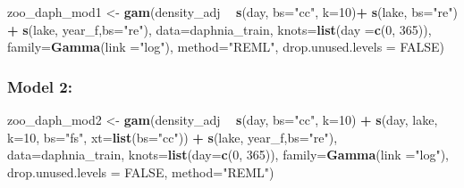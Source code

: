 \documentclass[12pt]{article}
\newenvironment{Shaded}{\begin{snugshade}}{\end{snugshade}}
\newcommand{\KeywordTok}[1]{\textcolor[rgb]{0.13,0.29,0.53}{\textbf{#1}}}
\newcommand{\DataTypeTok}[1]{\textcolor[rgb]{0.13,0.29,0.53}{#1}}
\newcommand{\DecValTok}[1]{\textcolor[rgb]{0.00,0.00,0.81}{#1}}
\newcommand{\StringTok}[1]{\textcolor[rgb]{0.31,0.60,0.02}{#1}}
\newcommand{\OtherTok}[1]{\textcolor[rgb]{0.56,0.35,0.01}{#1}}
\newcommand{\OperatorTok}[1]{\textcolor[rgb]{0.81,0.36,0.00}{\textbf{#1}}}
\newcommand{\NormalTok}[1]{#1}
\begin{document}
\begin{Shaded}
\begin{Highlighting}[]
\NormalTok{zoo_daph_mod1 <-}\StringTok{ }\KeywordTok{gam}\NormalTok{(density_adj }\OperatorTok{~}\StringTok{ }\KeywordTok{s}\NormalTok{(day, }\DataTypeTok{bs=}\StringTok{"cc"}\NormalTok{, }\DataTypeTok{k=}\DecValTok{10}\NormalTok{)}\OperatorTok{+}
\StringTok{                       }\KeywordTok{s}\NormalTok{(lake, }\DataTypeTok{bs=}\StringTok{"re"}\NormalTok{) }\OperatorTok{+}\StringTok{ }
\StringTok{                       }\KeywordTok{s}\NormalTok{(lake, year_f,}\DataTypeTok{bs=}\StringTok{"re"}\NormalTok{),}
                     \DataTypeTok{data=}\NormalTok{daphnia_train,}
                     \DataTypeTok{knots=}\KeywordTok{list}\NormalTok{(}\DataTypeTok{day =}\KeywordTok{c}\NormalTok{(}\DecValTok{0}\NormalTok{, }\DecValTok{365}\NormalTok{)),}
                     \DataTypeTok{family=}\KeywordTok{Gamma}\NormalTok{(}\DataTypeTok{link =}\StringTok{"log"}\NormalTok{),}
                     \DataTypeTok{method=}\StringTok{"REML"}\NormalTok{,}
                     \DataTypeTok{drop.unused.levels =} \OtherTok{FALSE}\NormalTok{)}
\end{Highlighting}
\end{Shaded}

\subsubsection{Model 2:}\label{model-2}

\begin{Shaded}
\begin{Highlighting}[]
\NormalTok{zoo_daph_mod2 <-}
\StringTok{  }\KeywordTok{gam}\NormalTok{(density_adj }\OperatorTok{~}\StringTok{ }\KeywordTok{s}\NormalTok{(day, }\DataTypeTok{bs=}\StringTok{"cc"}\NormalTok{, }\DataTypeTok{k=}\DecValTok{10}\NormalTok{) }\OperatorTok{+}\StringTok{ }
\StringTok{        }\KeywordTok{s}\NormalTok{(day, lake, }\DataTypeTok{k=}\DecValTok{10}\NormalTok{, }\DataTypeTok{bs=}\StringTok{"fs"}\NormalTok{, }\DataTypeTok{xt=}\KeywordTok{list}\NormalTok{(}\DataTypeTok{bs=}\StringTok{"cc"}\NormalTok{)) }\OperatorTok{+}\StringTok{ }
\StringTok{        }\KeywordTok{s}\NormalTok{(lake, year_f,}\DataTypeTok{bs=}\StringTok{"re"}\NormalTok{),}
      \DataTypeTok{data=}\NormalTok{daphnia_train, }
      \DataTypeTok{knots=}\KeywordTok{list}\NormalTok{(}\DataTypeTok{day=}\KeywordTok{c}\NormalTok{(}\DecValTok{0}\NormalTok{, }\DecValTok{365}\NormalTok{)), }
      \DataTypeTok{family=}\KeywordTok{Gamma}\NormalTok{(}\DataTypeTok{link =}\StringTok{"log"}\NormalTok{),}
      \DataTypeTok{drop.unused.levels =} \OtherTok{FALSE}\NormalTok{,}
      \DataTypeTok{method=}\StringTok{"REML"}\NormalTok{)}
\end{Highlighting}
\end{Shaded}
\end{document}
